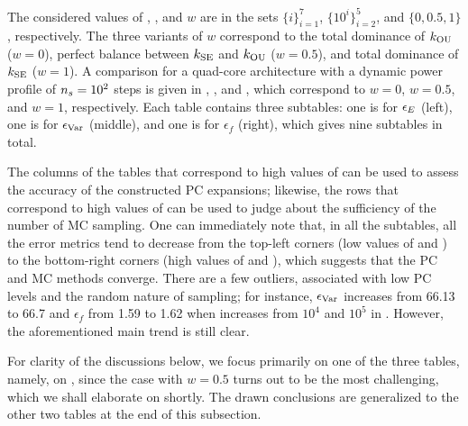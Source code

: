 The considered values of \lc, \no, and $w$ are in the sets $\{ i \}_{i = 1}^7$,
$\{ 10^i \}_{i = 2}^5$, and $\{ 0, 0.5, 1 \}$, respectively. The three variants
of $w$ correspond to the total dominance of $k_{\mathrm{OU}}$ ($w = 0$), perfect balance
between $k_{\mathrm{SE}}$ and $k_{\mathrm{OU}}$ ($w = 0.5$), and total dominance of $k_{\mathrm{SE}}$ ($w =
1$). A comparison for a quad-core architecture with a dynamic power profile of
${n_{s}} = 10^2$ steps is given in ,
, and , which correspond to $w
= 0$, $w = 0.5$, and $w = 1$, respectively. Each table contains three
subtables: one is for $\epsilon_{\expectation}$ (left), one is for
$\epsilon_{\variance}$ (middle), and one is for $\epsilon_f$ (right), which
gives nine subtables in total.

The columns of the tables that correspond to high values of \no can be used to
assess the accuracy of the constructed \ac{PC} expansions; likewise, the rows
that correspond to high values of \lc can be used to judge about the
sufficiency of the number of \ac{MC} sampling. One can immediately note that,
in all the subtables, all the error metrics tend to decrease from the top-left
corners (low values of \lc and \ns) to the bottom-right corners (high values of
\lc and \ns), which suggests that the \ac{PC} and \ac{MC} methods converge.
There are a few outliers, associated with low \ac{PC} levels and the random
nature of sampling; for instance, $\epsilon_{\variance}$ increases from 66.13
to 66.7 and $\epsilon_f$ from 1.59 to 1.62 when \no increases from $10^4$ and
$10^5$ in . However, the aforementioned main trend is
still clear.

For clarity of the discussions below, we focus primarily on one of the three
tables, namely, on , since the case with $w = 0.5$
turns out to be the most challenging, which we shall elaborate on shortly. The
drawn conclusions are generalized to the other two tables at the end of this
subsection.

